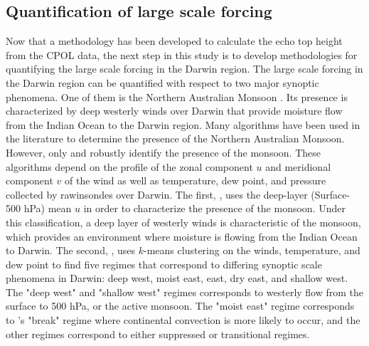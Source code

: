 \documentclass[journal abbreviation, manuscript]{copernicus}
\begin{document}
\subsection{Quantification of large scale forcing} \label{largescaleforcing}

    Now that a methodology has been developed to calculate the echo top height from the CPOL data, the next step in this study is to develop methodologies for quantifying the large scale forcing in the Darwin region. The large scale forcing in the Darwin region can be quantified with respect to two major synoptic phenomena. One of them is the Northern Australian Monsoon \citep{Dros1996, Popeetal2008}. Its presence is characterized by deep westerly winds over Darwin that provide moisture flow from the Indian Ocean to the Darwin region. Many algorithms have been used in the literature to determine the presence of the Northern Australian Monsoon. However, only \cite{Dros1996} and \cite{Popeetal2008} robustly identify the presence of the monsoon. These algorithms depend on the profile of the zonal component $u$ and meridional component $v$ of the wind as well as temperature, dew point, and pressure collected by rawinsondes over Darwin. The first, \cite{Dros1996}, uses the deep-layer (Surface-500 hPa) mean $u$ in order to characterize the presence of the monsoon. Under this classification, a deep layer of westerly winds is characteristic of the monsoon, which provides an environment where moisture is flowing from the Indian Ocean to Darwin. The second, \cite{Popeetal2008}, uses $k$-means clustering on the winds, temperature, and dew point to find five regimes that correspond to differing synoptic scale phenomena in Darwin: deep west, moist east, east, dry east, and shallow west. The "deep west"  and "shallow west" regimes corresponds to westerly flow from the surface to 500 hPa, or the active monsoon. The "moist east" regime corresponds to \citep{Dros1996}'s "break" regime where continental convection is more likely to occur, and the other regimes correspond to either suppressed or transitional regimes. 
    
\end{document}
